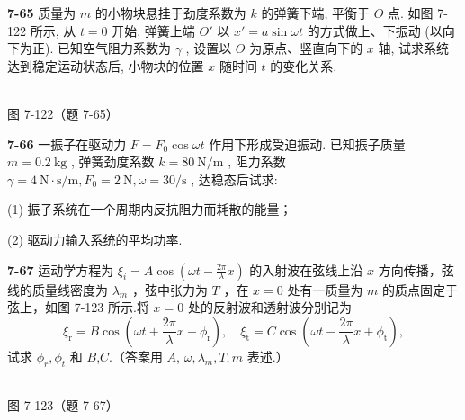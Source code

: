\newpage

\textbf{7-65} 质量为 $m$ 的小物块悬挂于劲度系数为 $k$ 的弹簧下端, 平衡于 $O$ 点. 如图 7-122 所示, 从 $t = 0$ 开始, 弹簧上端 $O'$ 以 $x' = a \sin \omega t$ 的方式做上、下振动 (以向下为正). 已知空气阻力系数为 $\gamma$ , 设置以 $O$ 为原点、竖直向下的 $x$ 轴, 试求系统达到稳定运动状态后, 小物块的位置 $x$ 随时间 $t$ 的变化关系.

\begin{center}
\resizebox{0.34\textwidth}{!}{}\\[4pt]
{\small 图 7-122（题 7-65）}
\end{center}

\newpage

\textbf{7-66} 一振子在驱动力 $F = F_{0} \cos \omega t$ 作用下形成受迫振动. 已知振子质量 $m = 0.2 \mathrm{~kg}$ , 弹簧劲度系数 $k = 80 \mathrm{~N} / \mathrm{m}$ , 阻力系数 $\gamma = 4 \mathrm{~N} \cdot \mathrm{s} / \mathrm{m}, F_{0} = 2 \mathrm{~N}, \omega = 30 / \mathrm{s}$ , 达稳态后试求:

(1) 振子系统在一个周期内反抗阻力而耗散的能量；

(2) 驱动力输入系统的平均功率.

\newpage

\textbf{7-67} 运动学方程为 $\xi_{i} = A\cos \left(\omega t - \frac{2\pi}{\lambda} x\right)$ 的入射波在弦线上沿 $x$ 方向传播，弦线的质量线密度为 $\lambda_{m}$ ，弦中张力为 $T$ ，在 $x = 0$ 处有一质量为 $m$ 的质点固定于弦上，如图 7-123 所示.将 $x = 0$ 处的反射波和透射波分别记为
\[
\xi_ {\mathrm{r}} = B \cos \left(\omega t + \frac {2 \pi}{\lambda} x + \phi_ {\mathrm{r}}\right), \quad \xi_ {\mathrm{t}} = C \cos \left(\omega t - \frac {2 \pi}{\lambda} x + \phi_ {\mathrm{t}}\right),
\]
试求 $\phi_{r},\phi_{t}$ 和 $B$,$C$.（答案用 $A$, $\omega,\lambda_{m},T,m$ 表述.）

\begin{center}
\resizebox{0.50\textwidth}{!}{}\\[4pt]
{\small 图 7-123（题 7-67）}
\end{center}
